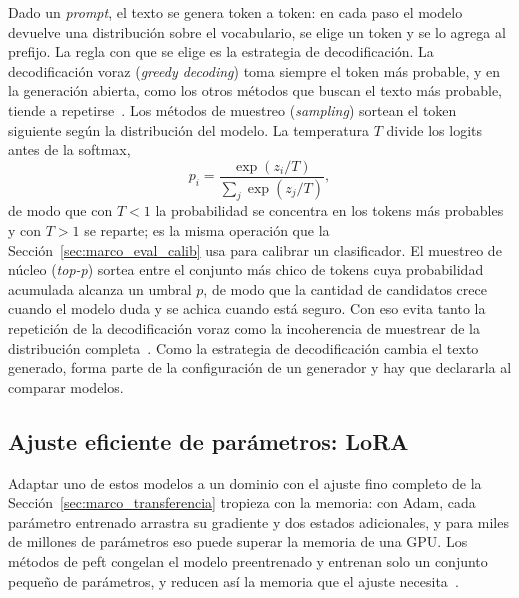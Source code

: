 Dado un \emph{prompt}, el texto se genera token a token: en cada paso el modelo devuelve una distribución
sobre el vocabulario, se elige un token y se lo agrega al prefijo. La regla con que se elige es la
estrategia de decodificación. La decodificación voraz (\emph{greedy decoding}) toma siempre el token más
probable, y en la generación abierta, como los otros métodos que buscan el texto más probable, tiende a
repetirse~\cite{holtzman2020curious}. Los
métodos de muestreo (\emph{sampling}) sortean el token siguiente según la distribución del modelo. La
temperatura $T$ divide los logits antes de la softmax,
\begin{equation}
    p_i = \frac{\exp(z_i / T)}{\sum_{j} \exp(z_j / T)},
    \label{eq:marco_temperatura}
\end{equation}
de modo que con $T<1$ la probabilidad se concentra en los tokens más probables y con $T>1$ se reparte; es
la misma operación que la Sección~\ref{sec:marco_eval_calib} usa para calibrar un clasificador. El muestreo de
núcleo (\emph{top-p}) sortea entre el conjunto más chico de tokens cuya probabilidad acumulada alcanza un
umbral $p$, de modo que la cantidad de candidatos crece cuando el modelo duda y se achica cuando está seguro.
Con eso evita tanto la repetición de la decodificación voraz como la incoherencia de muestrear de la
distribución completa~\cite{holtzman2020curious}. Como la estrategia de decodificación cambia el texto
generado, forma parte de la configuración de un generador y hay que declararla al comparar modelos.

\subsection{Ajuste eficiente de parámetros: LoRA}
\label{sec:marco_llm_lora}

Adaptar uno de estos modelos a un dominio con el ajuste fino completo de la
Sección~\ref{sec:marco_transferencia} tropieza con la memoria: con Adam, cada parámetro entrenado arrastra su
gradiente y dos estados adicionales, y para miles de millones de parámetros eso puede superar la memoria de una
GPU. Los métodos de \gls{peft} congelan el modelo preentrenado y entrenan solo un conjunto pequeño de
parámetros, y reducen así la memoria que el ajuste necesita~\cite{hu2021lora}.

